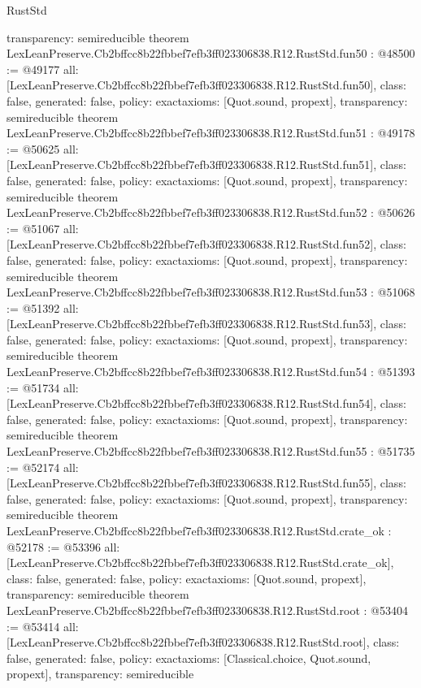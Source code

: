 \begin{lexlean}{RustStd}
\begin{coremodule}
{  transparency: semireducible
}
theorem LexLeanPreserve.Cb2bffcc8b22fbbef7efb3ff023306838.R12.RustStd.fun50 : @48500 := @49177 {
  all: [LexLeanPreserve.Cb2bffcc8b22fbbef7efb3ff023306838.R12.RustStd.fun50],
  class: false,
  generated: false,
  policy: exact{axioms: [Quot.sound, propext]},
  transparency: semireducible
}
theorem LexLeanPreserve.Cb2bffcc8b22fbbef7efb3ff023306838.R12.RustStd.fun51 : @49178 := @50625 {
  all: [LexLeanPreserve.Cb2bffcc8b22fbbef7efb3ff023306838.R12.RustStd.fun51],
  class: false,
  generated: false,
  policy: exact{axioms: [Quot.sound, propext]},
  transparency: semireducible
}
theorem LexLeanPreserve.Cb2bffcc8b22fbbef7efb3ff023306838.R12.RustStd.fun52 : @50626 := @51067 {
  all: [LexLeanPreserve.Cb2bffcc8b22fbbef7efb3ff023306838.R12.RustStd.fun52],
  class: false,
  generated: false,
  policy: exact{axioms: [Quot.sound, propext]},
  transparency: semireducible
}
theorem LexLeanPreserve.Cb2bffcc8b22fbbef7efb3ff023306838.R12.RustStd.fun53 : @51068 := @51392 {
  all: [LexLeanPreserve.Cb2bffcc8b22fbbef7efb3ff023306838.R12.RustStd.fun53],
  class: false,
  generated: false,
  policy: exact{axioms: [Quot.sound, propext]},
  transparency: semireducible
}
theorem LexLeanPreserve.Cb2bffcc8b22fbbef7efb3ff023306838.R12.RustStd.fun54 : @51393 := @51734 {
  all: [LexLeanPreserve.Cb2bffcc8b22fbbef7efb3ff023306838.R12.RustStd.fun54],
  class: false,
  generated: false,
  policy: exact{axioms: [Quot.sound, propext]},
  transparency: semireducible
}
theorem LexLeanPreserve.Cb2bffcc8b22fbbef7efb3ff023306838.R12.RustStd.fun55 : @51735 := @52174 {
  all: [LexLeanPreserve.Cb2bffcc8b22fbbef7efb3ff023306838.R12.RustStd.fun55],
  class: false,
  generated: false,
  policy: exact{axioms: [Quot.sound, propext]},
  transparency: semireducible
}
theorem LexLeanPreserve.Cb2bffcc8b22fbbef7efb3ff023306838.R12.RustStd.crate_ok : @52178 := @53396 {
  all: [LexLeanPreserve.Cb2bffcc8b22fbbef7efb3ff023306838.R12.RustStd.crate_ok],
  class: false,
  generated: false,
  policy: exact{axioms: [Quot.sound, propext]},
  transparency: semireducible
}
theorem LexLeanPreserve.Cb2bffcc8b22fbbef7efb3ff023306838.R12.RustStd.root : @53404 := @53414 {
  all: [LexLeanPreserve.Cb2bffcc8b22fbbef7efb3ff023306838.R12.RustStd.root],
  class: false,
  generated: false,
  policy: exact{axioms: [Classical.choice, Quot.sound, propext]},
  transparency: semireducible
}


\end{coremodule}
\end{lexlean}
